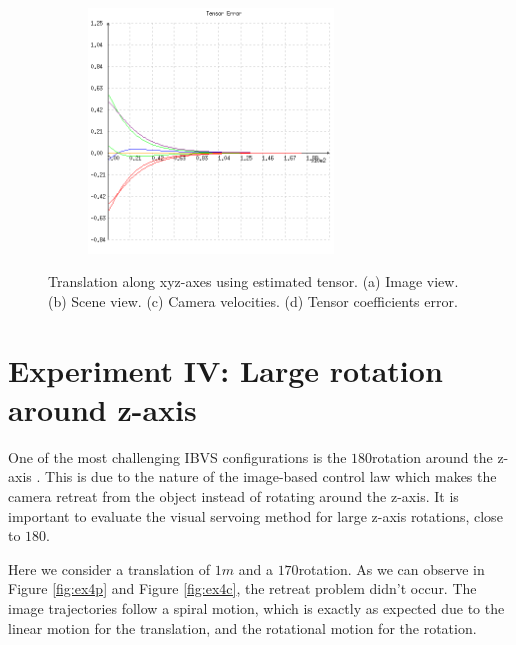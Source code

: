 \begin{figure}[ht!]
\begin{mdframed}[linecolor=black!30,backgroundcolor=black!5]
\begin{subfigure}{.48\textwidth}
    \caption{}
    \label{fig:ex3cvelocity}
  \end{subfigure}
  \begin{subfigure}{.48\textwidth}
    \centering
    \includegraphics[width=65mm]{figures/plots/ex3cerror.png}
    \caption{}
    \label{fig:ex3cerror}
  \end{subfigure}
  \caption{Translation along xyz-axes using estimated tensor. (a) Image view. (b) Scene view. (c) Camera velocities. (d) Tensor coefficients error.}
  \label{fig:ex3c}
\end{mdframed}
\end{figure}

\section{Experiment IV: Large rotation around z-axis}
One of the most challenging IBVS configurations is the $180$\textdegree rotation around the z-axis \cite{chaumette2006visual}\cite{chaumette1998potential}. This is due to the nature of the image-based control law which makes the camera retreat from the object instead of rotating around the z-axis. It is important to evaluate the visual servoing method for large z-axis rotations, close to $180$\textdegree.

Here we consider a translation of $1m$ and a $170$\textdegree rotation. As we can observe in Figure \ref{fig:ex4p} and Figure \ref{fig:ex4c}, the retreat problem didn't occur. The image trajectories follow a spiral motion, which is exactly as expected due to the linear motion for the translation, and the rotational motion for the rotation.


